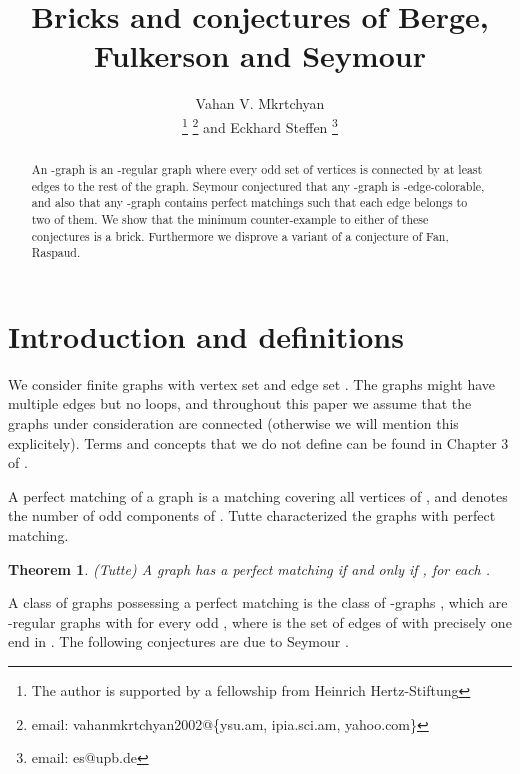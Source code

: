 \documentclass[fleqn,12pt]{article}
\newtheorem{theorem}{Theorem}
\begin{document}
\title{Bricks and conjectures of Berge, Fulkerson and Seymour}

\author{Vahan V. Mkrtchyan\address[MCSD]{Paderborn Institute for Advanced Studies in Computer Science and Engineering,
Paderborn University, Warburger Str. 100, 33098 Paderborn, Germany}\thanks{The author is supported by a fellowship from Heinrich Hertz-Stiftung}
\thanks{email: vahanmkrtchyan2002@\{ysu.am, ipia.sci.am,
yahoo.com\}}
                        and
        Eckhard Steffen \addressmark[MCSD]\thanks{email: es@upb.de}}



\maketitle

\begin{abstract}
An -graph is an -regular graph where every odd set of vertices is connected by at least  edges to the rest of the graph. Seymour conjectured that any -graph is -edge-colorable, 
and also that any -graph contains  perfect matchings such that each edge belongs to two of them. We show that the minimum counter-example to either of these conjectures is a brick.
Furthermore we disprove a variant of a conjecture of Fan, Raspaud. 
\end{abstract}


\section{Introduction and definitions}

We consider finite graphs  with vertex set  and edge set . The graphs might have multiple 
edges but no loops, and throughout this paper we assume that the graphs under consideration are connected (otherwise we will mention this explicitely). 
Terms and concepts that we do not define can be found in Chapter 3 of \cite{Handbook}.

A perfect matching of a graph  is a matching covering all vertices of , and  denotes the number of odd components of .  
Tutte characterized the graphs with perfect matching.

\begin{theorem}\label{Tutte}(Tutte) A graph  has a perfect matching if and only if , for each .
\end{theorem}

A class of graphs possessing a perfect matching is the class of -graphs \cite{Seymour_1979}, which are -regular graphs with   for every odd , 
where  is the set of edges of  with precisely one end in . The following conjectures are due to Seymour \cite{Seymour_1979}.
\end{document}
